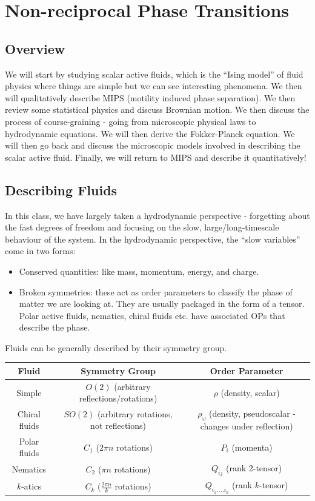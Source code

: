 \section{Non-reciprocal Phase Transitions}

\subsection{Overview}
We will start by studying scalar active fluids, which is the ``Ising model'' of fluid physics where things are simple but we can see interesting phenomena. We then will qualitatively describe MIPS (motility induced phase separation). We then review some statistical physics and discuss Brownian motion. We then discuss the process of course-graining - going from microscopic physical laws to hydrodynamic equations. We will then derive the Fokker-Planck equation. We will then go back and discuss the microscopic models involved in describing the scalar active fluid. Finally, we will return to MIPS and describe it quantitatively!

\subsection{Describing Fluids}
In this class, we have largely taken a hydrodynamic perspective - forgetting about the fast degrees of freedom and focusing on the slow, large/long-timescale behaviour of the system. In the hydrodynamic perspective, the ``slow variables'' come in two forms:
\begin{itemize}
    \item Conserved quantities: like mass, momentum, energy, and charge.
    \item Broken symmetries: these act as order parameters to classify the phase of matter we are looking at. They are usually packaged in the form of a tensor. Polar active fluids, nematics, chiral fluids etc. have associated OPs that describe the phase.
\end{itemize}

Fluids can be generally described by their symmetry group.

\begin{table}[htbp]
    \centering
    \begin{tabular}{|c|c|c|}
        \hline Fluid & Symmetry Group & Order Parameter
        \\ \hline Simple & $O(2)$ (arbitrary reflections/rotations) & $\rho$ (density, scalar)
        \\ Chiral fluids & $SO(2)$ (arbitrary rotations, not reflections) & $\rho_\omega$ (density, pseudoscalar - changes under reflection)
        \\ Polar fluids & $C_1$ ($2\pi n$ rotations) & $P_i$ (momenta)
        \\ Nematics & $C_2$ ($\pi n$ rotations) & $Q_{ij}$ (rank 2-tensor)
        \\ $k$-atics  & $C_k$ ($\frac{2\pi n}{k}$ rotations) & $Q_{i_1, \ldots i_k}$ (rank $k$-tensor)
        \\ \hline
    \end{tabular}
\end{table}

